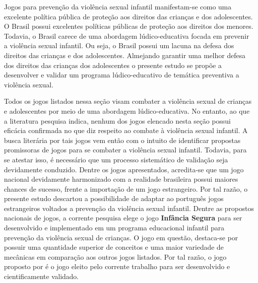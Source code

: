 
Jogos para prevenção da violência sexual infantil manifestam-se como uma excelente política pública de proteção aos direitos das crianças e dos adolescentes. O Brasil possui excelentes políticas públicas de proteção aos direitos dos menores. Todavia, o Brasil carece de uma abordagem lúdico-educativa focada em prevenir a violência sexual infantil. Ou seja, o Brasil possui um lacuna na defesa dos direitos das crianças e dos adolescentes. Almejando garantir uma melhor defesa dos direitos das crianças dos adolescentes o presente estudo se propõe a desenvolver e validar um programa lúdico-educativo de temática preventiva a violência sexual. 

Todos os jogos listados nessa seção visam combater a violência sexual de crianças e adolescentes por meio de uma abordagem lúdico-educativa. No entanto, ao que a literatura pesquisa indica, nenhum dos jogos elencado nesta seção possui eficácia confirmada no que diz respeito ao combate à violência sexual infantil. A busca literária por tais jogos vem então com o intuito de identificar propostas promissoras de jogos para se combater a violência sexual infantil. Todavia, para se atestar isso, é necessário que um processo sistemático de validação seja devidamente conduzido. Dentre os jogos apresentados, acredita-se que um jogo nacional devidamente harmonizado com a realidade brasileira possui maiores chances de sucesso, frente a importação de um jogo estrangeiro. Por tal razão, o presente estudo descartou a possibilidade de adaptar ao português jogos estrangeiros voltados a prevenção da violência sexual infantil. Dentre as propostos nacionais de jogos, a corrente pesquisa elege o jogo \textbf{Infância Segura} para ser desenvolvido e implementado em um programa educacional infantil para prevenção da violência sexual de crianças. O jogo em questão, destaca-se por possuir uma quantidade superior de conceitos e uma maior variedade de mecânicas em comparação aos outros jogos listados. Por tal razão, o jogo proposto por  é o jogo eleito pelo corrente trabalho para ser desenvolvido e cientificamente validado.